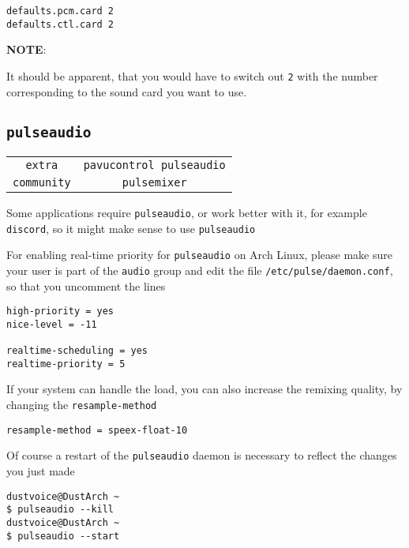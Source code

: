 \documentclass[9pt]{report}
\newcommand{\admonition}[2]{\textbf{#1}: {#2}}
\begin{document}
\begin{verbatim}
defaults.pcm.card 2
defaults.ctl.card 2
\end{verbatim}

\admonition{NOTE}{It should be apparent, that you would have to switch out \texttt{2} with the number corresponding to the sound card you want to use.

}

\vfill\eject

\hypertarget{x-pulseaudio}{\subsection{\texttt{pulseaudio}}}
\begin{center}
\begin{tabular}{|c|c|}
\hline
\texttt{extra} & \texttt{pavucontrol pulseaudio} \\ 
\texttt{community} & \texttt{pulsemixer} \\ 
\hline
\end{tabular}
\end{center}

Some applications require \texttt{pulseaudio}, or work better with it, for example \texttt{discord}, so it might make sense to use \texttt{pulseaudio}


For enabling real-time priority for \texttt{pulseaudio} on Arch Linux, please make sure your user is part of the \texttt{audio} group and edit the file \texttt{/etc/pulse/daemon.conf}, so that you uncomment the lines


\begin{verbatim}
high-priority = yes
nice-level = -11

realtime-scheduling = yes
realtime-priority = 5
\end{verbatim}

If your system can handle the load, you can also increase the remixing quality, by changing the \texttt{resample-method}


\begin{verbatim}
resample-method = speex-float-10
\end{verbatim}

Of course a restart of the \texttt{pulseaudio} daemon is necessary to reflect the changes you just made


\begin{verbatim}
dustvoice@DustArch ~
$ pulseaudio --kill
dustvoice@DustArch ~
$ pulseaudio --start
\end{verbatim}
\end{document}
